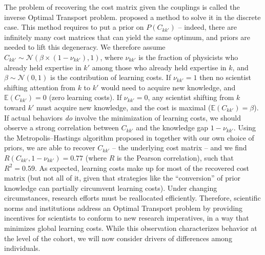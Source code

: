 \documentclass{article}
\begin{document}
The problem of recovering the cost matrix given the couplings is called the inverse Optimal Transport problem. \citet{Chu2021} proposed a method to solve it in the discrete case. This method requires to put a prior on $P(C_{kk'})$ -- indeed, there are infinitely many cost matrices that can yield the same optimum, and priors are needed to lift this degeneracy. We therefore assume $C_{kk'}\sim \mathcal{N}(\beta \times (1-\nu_{kk'}),1)$, where $\nu_{kk'}$ is the fraction of physicists who already held expertise in $k'$ among those who already held expertise in $k$, and $\beta\sim\mathcal{N}(0,1)$ is the contribution of learning costs. If $\nu_{kk'}=1$ then no scientist shifting attention from $k$ to $k'$ would need to acquire new knowledge, and $\mathbb{E}(C_{kk'})=0$ (zero learning costs). If $\nu_{kk'}=0$, any scientist shifting from $k$ toward $k'$ must acquire new knowledge, and the cost is maximal ($\mathbb{E}(C_{kk'})=\beta$). If actual behaviors \textit{do} involve the minimization of learning costs, we should observe a strong correlation between $C_{kk'}$ and the knowledge gap $1-\nu_{kk'}$.  Using the Metropolis–Hastings algorithm proposed in \citealt{Chu2021} together with our own choice of priors, we are able to recover $C_{kk'}$ -- the underlying cost matrix -- and we find $R(C_{kk'},1-\nu_{kk'})=0.77$ (where $R$ is the Pearson correlation), such that $R^2=0.59$. As expected, learning costs make up for most of the recovered cost matrix (but 
 not all of it, given that strategies like the ``conversion'' of prior knowledge can partially circumvent learning costs). Under changing circumstances, research efforts must be reallocated efficiently. Therefore, scientific norms and institutions address an Optimal Transport problem by providing incentives for scientists to conform to new research imperatives, in a way that minimizes global learning costs. While this observation characterizes behavior at the level of the cohort, we will now consider drivers of differences among individuals.

\end{document}
